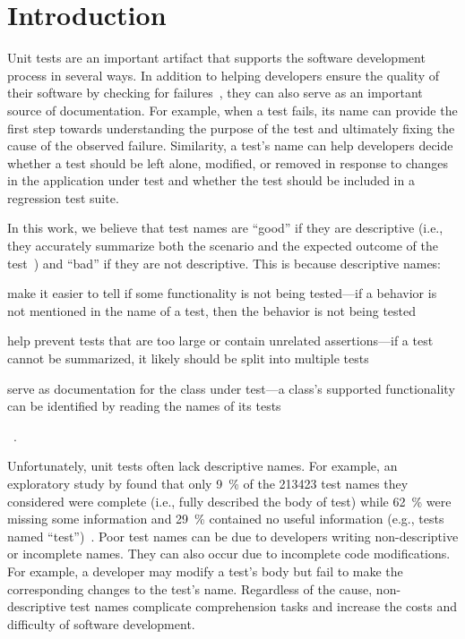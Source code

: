 \documentclass[proposal.tex]{subfiles}
\begin{document}
\newpage
\section{Introduction}
\label{sec:introduction}

Unit tests are an important artifact that supports the software development process in several ways.
%
In addition to helping developers ensure the quality of their software by checking for failures~\cite{daka2014survey}, they can also serve as an important source of documentation.
%
For example, when a test fails, its name can provide the first step towards understanding the purpose of the test and ultimately fixing the cause of the observed failure.
%
Similarity, a test's name can help developers decide whether a test should be left alone, modified, or removed in response to changes in the application under test and whether the test should be included in a regression test suite.


In this work, we believe that test names are \enquote{good} if they are descriptive (i.e., they accurately summarize both the scenario and the expected outcome of the test~\cite{trenk14}) and \enquote{bad} if they are not descriptive.
%
This is because descriptive names:
\begin{enumerate*}
\item make it easier to tell if some functionality is not being tested---if a behavior is not mentioned in the name of a test, then the behavior is not being tested
\item help prevent tests that are too large or contain unrelated assertions---if a test cannot be summarized, it likely should be split into multiple tests
\item serve as documentation for the class under test---a class's supported functionality can be identified by reading the names of its tests
\end{enumerate*}~\cite{zhang2015automatically}.


Unfortunately, unit tests often lack descriptive names.
%
For example, an exploratory study by \citeauthor{zhang2015automatically} found that only \SI{9}{\percent} of the \num{213423} test names they considered were complete (i.e., fully described the body of test) while \SI{62}{\percent} were missing some information and \SI{29}{\percent} contained no useful information (e.g., tests named \enquote{test})~\cite{zhang2015automatically}.
%
Poor test names can be due to developers writing non-descriptive or incomplete names.
%
They can also occur due to incomplete code modifications.
%
For example, a developer may modify a test's body but fail to make the corresponding changes to the test's name.
%
Regardless of the cause, non-descriptive test names complicate comprehension tasks and increase the costs and difficulty of software development.
\end{document}

